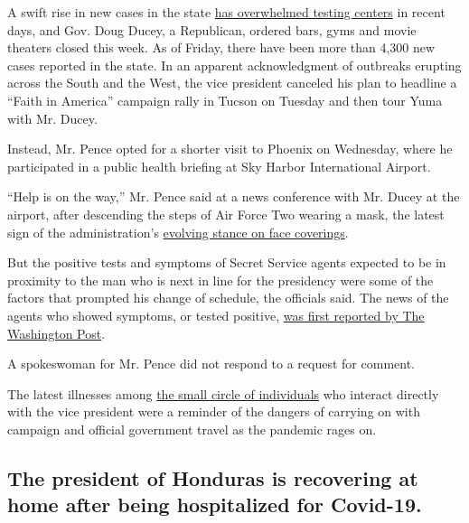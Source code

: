 A swift rise in new cases in the state
\href{https://www.nytimes3xbfgragh.onion/2020/06/25/upshot/virus-testing-shortfall-arizona.html}{has
overwhelmed testing centers} in recent days, and Gov. Doug Ducey, a
Republican, ordered bars, gyms and movie theaters closed this week. As
of Friday, there have been more than 4,300 new cases reported in the
state. In an apparent acknowledgment of outbreaks erupting across the
South and the West, the vice president canceled his plan to headline a
``Faith in America'' campaign rally in Tucson on Tuesday and then tour
Yuma with Mr. Ducey.

Instead, Mr. Pence opted for a shorter visit to Phoenix on Wednesday,
where he participated in a public health briefing at Sky Harbor
International Airport.

``Help is on the way,'' Mr. Pence said at a news conference with Mr.
Ducey at the airport, after descending the steps of Air Force Two
wearing a mask, the latest sign of the administration's
\href{https://www.nytimes3xbfgragh.onion/2020/07/01/us/coronavirus-masks.html}{evolving
stance on face coverings}.

But the positive tests and symptoms of Secret Service agents expected to
be in proximity to the man who is next in line for the presidency were
some of the factors that prompted his change of schedule, the officials
said. The news of the agents who showed symptoms, or tested positive,
\href{https://www.washingtonpost.com/politics/secret-service-agents-preparing-for-pence-arizona-trip-contracted-coronavirus/2020/07/02/8029280c-bc97-11ea-bdaf-a129f921026f_story.html}{was
first reported by The Washington Post}.

A spokeswoman for Mr. Pence did not respond to a request for comment.

The latest illnesses among
\href{https://www.nytimes3xbfgragh.onion/2020/05/08/us/politics/white-house-coronavirus-safety.html}{the
small circle of individuals} who interact directly with the vice
president were a reminder of the dangers of carrying on with campaign
and official government travel as the pandemic rages on.

\hypertarget{the-president-of-honduras-is-recovering-at-home-after-being-hospitalized-for-covid-19}{%
\subsection{The president of Honduras is recovering at home after being
hospitalized for
Covid-19.}\label{the-president-of-honduras-is-recovering-at-home-after-being-hospitalized-for-covid-19}}

